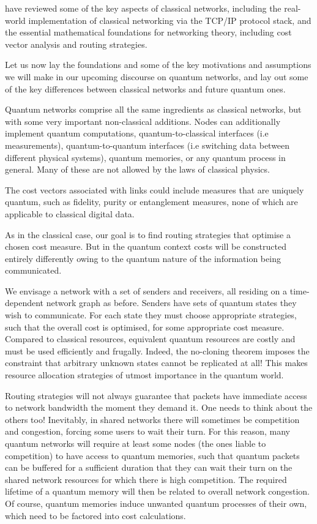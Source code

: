 %
%

 have reviewed some of the key aspects of classical networks, including the real-world implementation of classical networking via the TCP/IP protocol stack, and the essential mathematical foundations for networking theory, including cost vector analysis and routing strategies.

Let us now lay the foundations and some of the key motivations and assumptions we will make in our upcoming discourse on quantum networks, and lay out some of the key differences between classical networks and future quantum ones.

Quantum networks comprise all the same ingredients as classical networks, but with some very important non-classical additions. Nodes can additionally implement quantum computations, quantum-to-classical interfaces (i.e measurements), quantum-to-quantum interfaces (i.e switching data between different physical systems), quantum memories, or any quantum process in general. Many of these are not allowed by the laws of classical physics.

The cost vectors associated with links could include measures that are uniquely quantum, such as fidelity, purity or entanglement measures, none of which are applicable to classical digital data.

As in the classical case, our goal is to find routing strategies that optimise a chosen cost measure. But in the quantum context costs will be constructed entirely differently owing to the quantum nature of the information being communicated.

We envisage a network with a set of senders and receivers, all residing on a time-dependent network graph as before. Senders have sets of quantum states they wish to communicate. For each state they must choose appropriate strategies, such that the overall cost is optimised, for some appropriate cost measure. Compared to classical resources, equivalent quantum resources are costly and must be used efficiently and frugally. Indeed, the no-cloning theorem imposes the constraint that arbitrary unknown states cannot be replicated at all! This makes resource allocation strategies of utmost importance in the quantum world.

Routing strategies will not always guarantee that packets have immediate access to network bandwidth the moment they demand it. One needs to think about the others too! Inevitably, in shared networks there will sometimes be competition and congestion, forcing some users to wait their turn. For this reason, many quantum networks will require at least some nodes (the ones liable to competition) to have access to quantum memories, such that quantum packets can be buffered for a sufficient duration that they can wait their turn on the shared network resources for which there is high competition. The required lifetime of a quantum memory will then be related to overall network congestion. Of course, quantum memories induce unwanted quantum processes of their own, which need to be factored into cost calculations.

